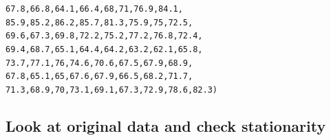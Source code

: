 \documentclass{article}\usepackage[]{graphicx}\usepackage[]{color}
\makeatletter
\newcommand{\hlnum}[1]{\textcolor[rgb]{0.686,0.059,0.569}{#1}}%
\newcommand{\hlstd}[1]{\textcolor[rgb]{0.345,0.345,0.345}{#1}}%
\newenvironment{kframe}{%
 \def\at@end@of@kframe{}%
 \ifinner\ifhmode%
  \def\at@end@of@kframe{\end{minipage}}%
  \begin{minipage}{\columnwidth}%
 \fi\fi%
 \def\FrameCommand##1{\hskip\@totalleftmargin \hskip-\fboxsep
 \colorbox{shadecolor}{##1}\hskip-\fboxsep
     \hskip-\linewidth \hskip-\@totalleftmargin \hskip\columnwidth}%
 \MakeFramed {\advance\hsize-\width
   \@totalleftmargin\z@ \linewidth\hsize
   \@setminipage}}%
 {\par\unskip\endMakeFramed%
 \at@end@of@kframe}
\newenvironment{knitrout}{}{} %
\makeatother
\begin{document}
\begin{knitrout}
\begin{kframe}
\begin{alltt}
           \hlnum{67.8}\hlstd{,}  \hlnum{66.8}\hlstd{,}  \hlnum{64.1}\hlstd{,}  \hlnum{66.4}\hlstd{,} \hlnum{68}\hlstd{,}    \hlnum{71}\hlstd{,}    \hlnum{76.9}\hlstd{,}  \hlnum{84.1}\hlstd{,}
           \hlnum{85.9}\hlstd{,}  \hlnum{85.2}\hlstd{,}  \hlnum{86.2}\hlstd{,}  \hlnum{85.7}\hlstd{,} \hlnum{81.3}\hlstd{,}  \hlnum{75.9}\hlstd{,}  \hlnum{75}\hlstd{,}    \hlnum{72.5}\hlstd{,}
           \hlnum{69.6}\hlstd{,}  \hlnum{67.3}\hlstd{,}  \hlnum{69.8}\hlstd{,}  \hlnum{72.2}\hlstd{,} \hlnum{75.2}\hlstd{,}  \hlnum{77.2}\hlstd{,}  \hlnum{76.8}\hlstd{,}  \hlnum{72.4}\hlstd{,}
           \hlnum{69.4}\hlstd{,}  \hlnum{68.7}\hlstd{,}  \hlnum{65.1}\hlstd{,}  \hlnum{64.4}\hlstd{,} \hlnum{64.2}\hlstd{,}  \hlnum{63.2}\hlstd{,}  \hlnum{62.1}\hlstd{,}  \hlnum{65.8}\hlstd{,}
           \hlnum{73.7}\hlstd{,}  \hlnum{77.1}\hlstd{,}  \hlnum{76}\hlstd{,}    \hlnum{74.6}\hlstd{,} \hlnum{70.6}\hlstd{,}  \hlnum{67.5}\hlstd{,}  \hlnum{67.9}\hlstd{,}  \hlnum{68.9}\hlstd{,}
           \hlnum{67.8}\hlstd{,}  \hlnum{65.1}\hlstd{,}  \hlnum{65}\hlstd{,}    \hlnum{67.6}\hlstd{,} \hlnum{67.9}\hlstd{,}  \hlnum{66.5}\hlstd{,}  \hlnum{68.2}\hlstd{,}  \hlnum{71.7}\hlstd{,}
           \hlnum{71.3}\hlstd{,}  \hlnum{68.9}\hlstd{,}  \hlnum{70}\hlstd{,}    \hlnum{73.1}\hlstd{,} \hlnum{69.1}\hlstd{,}  \hlnum{67.3}\hlstd{,}  \hlnum{72.9}\hlstd{,}  \hlnum{78.6}\hlstd{,}  \hlnum{82.3}\hlstd{)}
\end{alltt}
\end{kframe}
\end{knitrout}


\subsection*{Look at original data and check stationarity}
\end{document}
